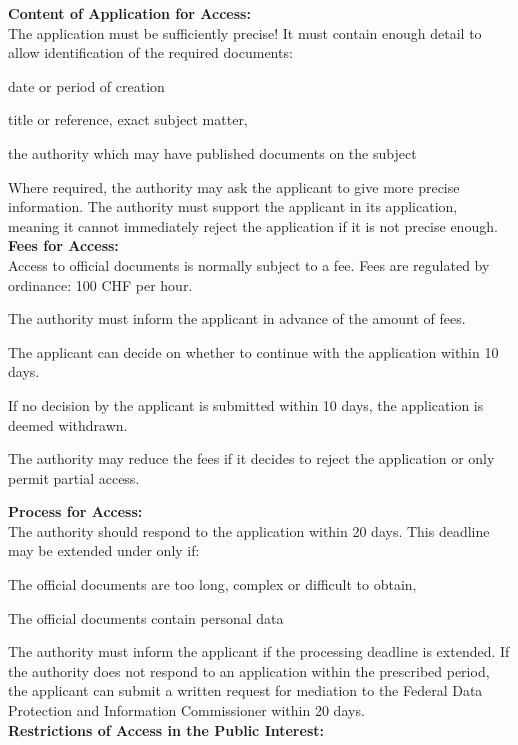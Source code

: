 \textbf{Content of Application for Access:}\\
The application must be sufficiently precise! It must contain enough detail to allow identification of the required
documents:
\begin{compactitem}
	\item date or period of creation
	\item title or reference, exact subject matter,
	\item the authority which may have published documents on the subject
\end{compactitem}
Where required, the authority may ask the applicant to give more precise information. The authority must support the applicant in its application, meaning it cannot immediately reject the application if it is not precise enough.\\
\textbf{Fees for Access:}\\
Access to official documents is normally subject to a fee. Fees are regulated by ordinance: 100 CHF per hour.
\begin{compactenum}
	\item The authority must inform the applicant in advance of the amount of fees.
	\item The applicant can decide on whether to continue with the application within 10 days.
	\item If no decision by the applicant is submitted within 10 days, the application is deemed withdrawn.
	\item The authority may reduce the fees if it decides to reject the application or only permit partial access.
\end{compactenum}
\textbf{Process for Access:}\\
The authority should respond to the application within 20 days. This deadline may be extended under only if:
\begin{compactitem}
	\item The official documents are too long, complex or difficult to obtain,
	\item The official documents contain personal data
\end{compactitem}
The authority must inform the applicant if the processing deadline is extended. If the authority does not respond to an application within the prescribed period, the applicant can submit a written request for mediation to the Federal Data Protection and Information Commissioner within 20 days.\\
\textbf{Restrictions of Access in the Public Interest:}
